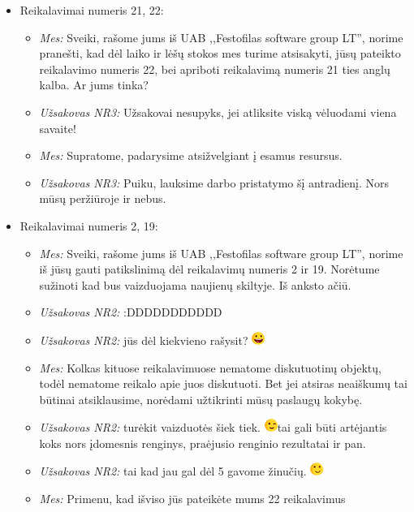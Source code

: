 \documentclass{VUMIFPSkursinis}
\begin{document}
\begin{itemize}
				\item Reikalavimai numeris 21, 22:
					\begin{itemize}
						\item \textit{Mes:} Sveiki, rašome jums iš UAB ,,Festofilas software group LT'', norime pranešti, kad dėl laiko ir lėšų stokos mes turime atsisakyti, jūsų pateikto reikalavimo numeris 22, bei apriboti reikalavimą numeris 21 ties anglų kalba. Ar jums tinka?
						\item \textit{Užsakovas NR3:} Užsakovai nesupyks, jei atliksite viską vėluodami viena savaite!
						\item \textit{Mes:} Supratome, padarysime atsižvelgiant į esamus resursus.
						\item \textit{Užsakovas NR3:} Puiku, lauksime darbo pristatymo šį antradienį. Nors mūsų peržiūroje ir nebus.
					\end{itemize}
				\item Reikalavimai numeris 2, 19:
					\begin{itemize}
						\item \textit{Mes:} Sveiki, rašome jums iš UAB ,,Festofilas software group LT'', norime iš jūsų gauti patikslinimą dėl reikalavimų numeris 2 ir 19. Norėtume sužinoti kad bus vaizduojama naujienų skiltyje. Iš anksto ačiū.
						\item \textit{Užsakovas NR2:} :DDDDDDDDDDD
						\item \textit{Užsakovas NR2:} jūs dėl kiekvieno rašysit? \includegraphics{img/PSI4/smalllaugh.png}
						\item \textit{Mes:} Kolkas kituose reikalavimuose nematome diskutuotinų objektų, todėl nematome reikalo apie juos diskutuoti. Bet jei atsiras neaiškumų tai būtinai atsiklausime, norėdami užtikrinti mūsų paslaugų kokybę.
						\item \textit{Užsakovas NR2:} turėkit vaizduotės šiek tiek. \includegraphics{img/PSI4/wink.png}tai gali būti artėjantis koks nors įdomesnis renginys, praėjusio renginio rezultatai ir pan.
						\item \textit{Užsakovas NR2:} tai kad jau gal dėl 5 gavome žinučių. \includegraphics{img/PSI4/smile.png}
						\item \textit{Mes:} Primenu, kad išviso jūs pateikėte mums 22 reikalavimus

\end{itemize}
\end{itemize}
\end{document}
